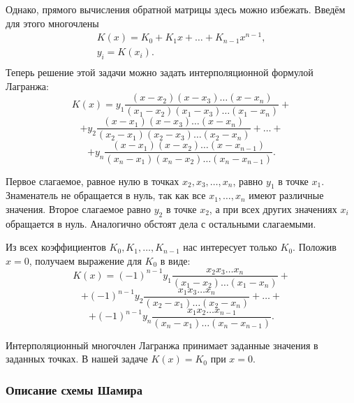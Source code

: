 Однако, прямого вычисления обратной матрицы здесь можно избежать. Введём для этого многочлены
\[ \begin{array}{c}
    K(x)= K_{0} +K_{1} x+ \ldots +K_{n-1} x^{n-1}, \\
    y_{i} =K(x_{i}). \\
\end{array} \]
Теперь решение этой задачи можно задать интерполяционной формулой Лагранжа:
\[
    K(x) = y_1 \frac{(x - x_2)(x - x_3) \dots (x - x_n)} {(x_1-x_2)(x_1-x_3) \dots (x_1-x_n)} +
\] \[
    + y_2 \frac{(x-x_1)(x-x_3) \dots (x-x_n)} {(x_2-x_1)(x_2-x_3) \dots (x_2-x_n)} + \dots +
\] \[
    + y_n \frac{(x-x_1)(x-x_2) \dots (x-x_{n-1})} {(x_n-x_1)(x_n-x_2) \dots (x_n-x_{n-1})}.
\]

Первое слагаемое, равное нулю в точках $x_2, x_3, \dots, x_n$, равно $y_1$ в точке $x_1$. Знаменатель не обращается в нуль, так как все $x_1, \dots, x_n$ имеют различные значения. Второе слагаемое равно $y_2$ в точке $x_2$, а при всех других значениях $x_i$ обращается в нуль. Аналогично обстоят дела с остальными слагаемыми.

Из всех коэффициентов $K_0, K_1, \dots, K_{n-1}$ нас интересует только $K_0$.
Положив $x=0$, получаем выражение для $K_{0} $ в виде:
\[
    K(x) = (-1)^{n-1} y_1 \frac{x_2 x_3 \dots x_n} {(x_1-x_2) \dots (x_1-x_n)} +
\] \[
    + (-1)^{n-1} y_2 \frac{x_1 x_3 \dots x_n} {(x_2-x_1) \dots (x_2-x_n)} + \dots +
\] \[
    + (-1)^{n-1} y_n \frac{x_1 x_2 \dots x_{n-1}} {(x_n-x_1) \dots (x_n-x_{n-1})}.
\]

Интерполяционный многочлен Лагранжа принимает заданные значения в заданных точках. В нашей задаче $K(x)=K_{0}$ при $x=0$.


\subsubsection{Описание схемы Шамира}

